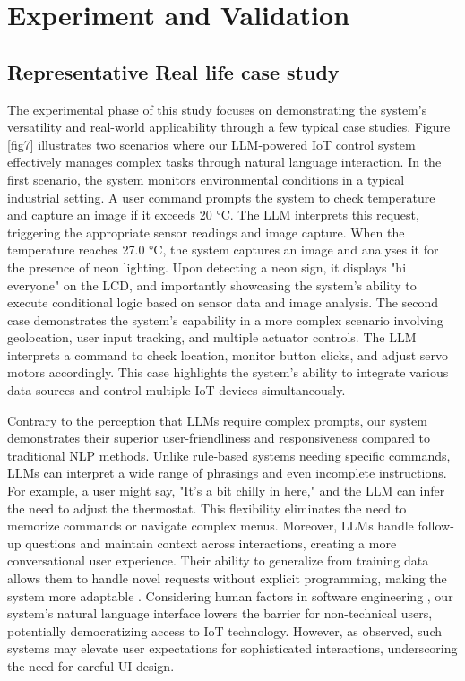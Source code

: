 \documentclass{ieeeaccess}
\begin{document}
\section{Experiment and Validation}\label{sec:experiment}

\subsection{Representative Real life case study}
The experimental phase of this study focuses on demonstrating the system's versatility and real-world applicability through a few typical case studies. Figure \ref{fig7} illustrates two scenarios where our LLM-powered IoT control system effectively manages complex tasks through natural language interaction. In the first scenario, the system monitors environmental conditions in a typical industrial setting. A user command prompts the system to check temperature and capture an image if it exceeds 20 °C. The LLM interprets this request, triggering the appropriate sensor readings and image capture. When the temperature reaches 27.0 °C, the system captures an image and analyses it for the presence of neon lighting. Upon detecting a neon sign, it displays "hi everyone" on the LCD, and importantly showcasing the system's ability to execute conditional logic based on sensor data and image analysis. The second case demonstrates the system's capability in a more complex scenario involving geolocation, user input tracking, and multiple actuator controls. The LLM interprets a command to check location, monitor button clicks, and adjust servo motors accordingly. This case highlights the system's ability to integrate various data sources and control multiple IoT devices simultaneously.

Contrary to the perception that LLMs require complex prompts, our system demonstrates their superior user-friendliness and responsiveness compared to traditional NLP methods. Unlike rule-based systems needing specific commands, LLMs can interpret a wide range of phrasings and even incomplete instructions. For example, a user might say, "It's a bit chilly in here," and the LLM can infer the need to adjust the thermostat. This flexibility eliminates the need to memorize commands or navigate complex menus. Moreover, LLMs handle follow-up questions and maintain context across interactions, creating a more conversational user experience. Their ability to generalize from training data allows them to handle novel requests without explicit programming, making the system more adaptable \cite{Kumar2024}. Considering human factors in software engineering \cite{1553657}, our system's natural language interface lowers the barrier for non-technical users, potentially democratizing access to IoT technology. However, as \citet{10.1145/3610977.3634966} observed, such systems may elevate user expectations for sophisticated interactions, underscoring the need for careful UI design. 
\end{document}
